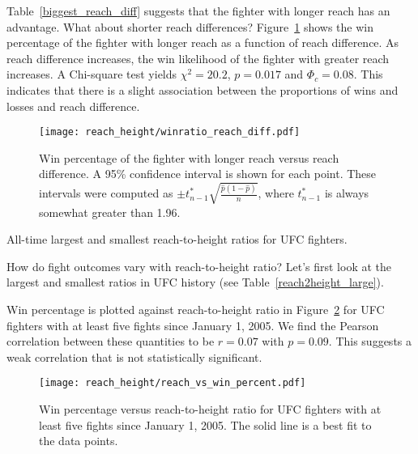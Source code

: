 \clearpage

Table~\ref{biggest_reach_diff} suggests that the fighter with longer
reach has an advantage. What about shorter reach differences?
Figure~\ref{winratio_reach_diff}
shows the win percentage of the fighter with
longer reach as a function of reach difference.
As reach difference increases, the win likelihood of the fighter with greater reach
increases. 
A Chi-square test yields $\chi^2=20.2$, $p=0.017$ and $\Phi_c=0.08$.
This indicates that there is a slight association between the proportions of wins and losses  
and reach difference.

\begin{figure}[h]
\begin{center}
\texttt{[image: reach\_height/winratio\_reach\_diff.pdf]}
\caption{Win percentage of the fighter with longer reach versus reach difference. A 95\%
confidence interval is shown for each point. These intervals were computed
as $\pm t_{n-1}^{*}\sqrt{\frac{\hat{p}(1-\hat{p})}{n}}$, where $t_{n-1}^{*}$ is always somewhat greater than
1.96.}
\label{winratio_reach_diff}
\end{center}
\end{figure}

\begin{center}
\begin{table}[h]

\caption{All-time largest and smallest reach-to-height ratios for UFC fighters.}
\label{reach2height_large}
\end{table}
\end{center}

How do fight outcomes vary with reach-to-height ratio? Let's first look
at the largest and smallest ratios in UFC history (see
Table~\ref{reach2height_large}).

\clearpage

Win percentage is plotted against reach-to-height ratio in
Figure~\ref{reach_vs_win_percent} for UFC
fighters with at least five fights since January 1, 2005.
We find the Pearson correlation between these quantities
to be $r=0.07$ with $p=0.09$. This suggests
a weak correlation that is not statistically significant.

\begin{figure}[h]
\begin{center}
\texttt{[image: reach\_height/reach\_vs\_win\_percent.pdf]}
\caption{Win percentage versus reach-to-height ratio for UFC
fighters with at least five fights since January 1, 2005. The solid line
is a best fit to the data points.}
\label{reach_vs_win_percent}
\end{center}
\end{figure}

